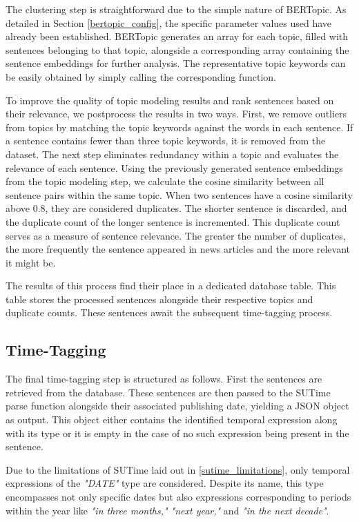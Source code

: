 \documentclass[a4paper,10pt]{report}
\begin{document}
The clustering step is straightforward due to the simple nature of BERTopic. As detailed in Section \ref{bertopic_config}, the specific parameter values used have already been established. BERTopic generates an array for each topic, filled with sentences belonging to that topic, alongside a corresponding array containing the sentence embeddings for further analysis. The representative topic keywords can be easily obtained by simply calling the corresponding function.

To improve the quality of topic modeling results and rank sentences based on their relevance, we postprocess the results in two ways.
First, we remove outliers from topics by matching the topic keywords against the words in each sentence. If a sentence contains fewer than three topic keywords, it is removed from the dataset. The next step eliminates redundancy within a topic and evaluates the relevance of each sentence. Using the previously generated sentence embeddings from the topic modeling step, we calculate the cosine similarity between all sentence pairs within the same topic. When two sentences have a cosine similarity above 0.8, they are considered duplicates. The shorter sentence is discarded, and the duplicate count of the longer sentence is incremented. This duplicate count serves as a measure of sentence relevance. The greater the number of duplicates, the more frequently the sentence appeared in news articles and the more relevant it might be.

The results of this process find their place in a dedicated database table. This table stores the processed sentences alongside their respective topics and duplicate counts. These sentences await the subsequent time-tagging process.

\subsection{Time-Tagging}
The final time-tagging step is structured as follows. First the sentences are retrieved from the database. These sentences are then passed to the SUTime parse function alongside their associated publishing date, yielding a JSON object as output. This object either contains the identified temporal expression along with its type or it is empty in the case of no such expression being present in the sentence.

Due to the limitations of SUTime laid out in \ref{sutime_limitations}, only temporal expressions of the \textit{"DATE"} type are considered. Despite its name, this type encompasses not only specific dates but also expressions corresponding to periods within the year like \textit{"in three months," "next year,"} and \textit{"in the next decade"}.
\end{document}
